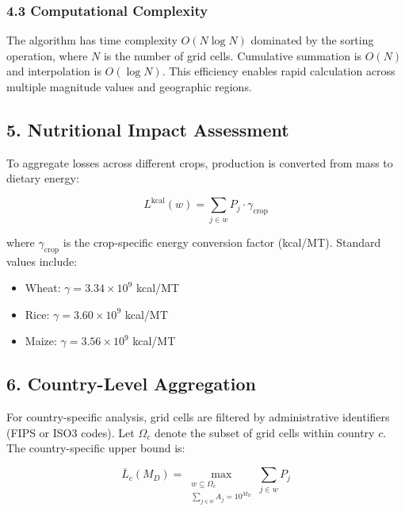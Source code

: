 \documentclass[11pt]{article}
\begin{document}
\subsubsection*{4.3 Computational Complexity}
The algorithm has time complexity $O(N \log N)$ dominated by the sorting operation, where $N$ is the number of grid cells. Cumulative summation is $O(N)$ and interpolation is $O(\log N)$. This efficiency enables rapid calculation across multiple magnitude values and geographic regions.

\subsection*{5. Nutritional Impact Assessment}

To aggregate losses across different crops, production is converted from mass to dietary energy:

\begin{equation}
L^{\text{kcal}}(w) = \sum_{j \in w} P_j \cdot \gamma_{\text{crop}}
\label{eq:loss_kcal}
\end{equation}

where $\gamma_{\text{crop}}$ is the crop-specific energy conversion factor (kcal/MT). Standard values include:
\begin{itemize}
    \item Wheat: $\gamma = 3.34 \times 10^9$ kcal/MT
    \item Rice: $\gamma = 3.60 \times 10^9$ kcal/MT
    \item Maize: $\gamma = 3.56 \times 10^9$ kcal/MT
\end{itemize}

\subsection*{6. Country-Level Aggregation}

For country-specific analysis, grid cells are filtered by administrative identifiers (FIPS or ISO3 codes). Let $\Omega_c$ denote the subset of grid cells within country $c$. The country-specific upper bound is:

\begin{equation}
\overline{L}_c(M_D) = \max_{\substack{w \subseteq \Omega_c \\ \sum_{j \in w} A_j = 10^{M_D}}} \sum_{j \in w} P_j
\label{eq:country_bound}
\end{equation}
\end{document}
